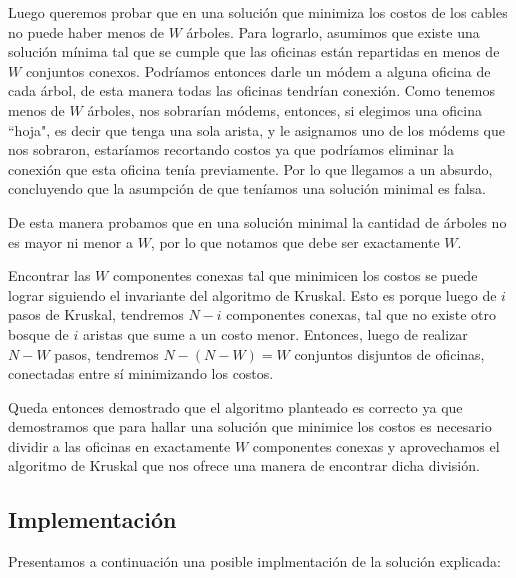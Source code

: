 \vspace{1em}

Luego queremos probar que en una solución que minimiza los costos de los cables no puede haber menos de $W$ árboles. Para lograrlo, asumimos que existe una solución mínima tal que se cumple que las oficinas están repartidas en menos de $W$ conjuntos conexos. Podríamos entonces darle un módem a alguna oficina de cada árbol, de esta manera todas las oficinas tendrían conexión. Como tenemos menos de $W$ árboles, nos sobrarían módems, entonces, si elegimos una oficina ``hoja", es decir que tenga una sola arista, y le asignamos uno de los módems que nos sobraron, estaríamos recortando costos ya que podríamos eliminar la conexión que esta oficina tenía previamente. Por lo que llegamos a un absurdo, concluyendo que la asumpción de que teníamos una solución minimal es falsa.

\vspace{1em}

De esta manera probamos que en una solución minimal la cantidad de árboles no es mayor ni menor a $W$, por lo que notamos que debe ser exactamente $W$. 

\vspace{1em}

Encontrar las $W$ componentes conexas tal que minimicen los costos se puede lograr siguiendo el invariante del algoritmo de Kruskal. Esto es porque luego de $i$ pasos de Kruskal, tendremos $N - i$ componentes conexas, tal que no existe otro bosque de $i$ aristas que sume a un costo menor. Entonces, luego de realizar $N - W$ pasos, tendremos $N - (N - W) = W$ conjuntos disjuntos de oficinas, conectadas entre sí minimizando los costos. 

\vspace{1em}

Queda entonces demostrado que el algoritmo planteado es correcto ya que demostramos que para hallar una solución que minimice los costos es necesario dividir a las oficinas en exactamente $W$ componentes conexas y aprovechamos el algoritmo de Kruskal que nos ofrece una manera de encontrar dicha división.

\vspace{1em}

\subsection{Implementación}
\vspace{1em}

Presentamos a continuación una posible implmentación de la solución explicada:

